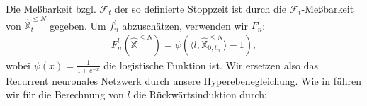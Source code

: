 \documentclass[12pt,titlepage,headsepline]{article}
\begin{document}
      Die Meßbarkeit bzgl. $\mathcal{F}_t$ der so definierte Stoppzeit ist durch die $\mathcal{F}_t$-Meßbarkeit von $\hat{\mathbb{X}}^{\leq N}_t$ gegeben. Um $f_n^l$ abzuschätzen, verwenden wir $F_n^l$:
      \begin{align*}
        F_n^l(\hat{\mathbb{X}}^{\leq N}) = \psi( \langle l, \hat{\mathbb{X}}^{\leq N}_{0,t_n} \rangle - 1),
      \end{align*}
      wobei $\psi(x) = \frac{1}{1+e^{-x}}$ die logistische Funktion ist. Wir ersetzen also das Recurrent neuronales Netzwerk durch unsere Hyperebenegleichung.
      \hfill\break
      Wie in \cite{becker_deep_2019} führen wir für die Berechnung von $l$ die Rückwärtsinduktion durch:
\end{document}
